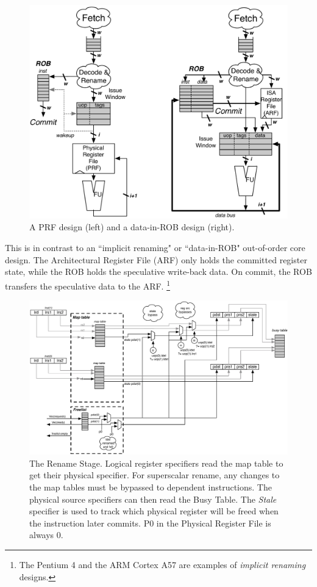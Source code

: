 \begin{figure}[htb]
	\centering
	\centerline{\includegraphics[scale =0.8] {figures/prf-and-arf}}
	\caption{ \small A PRF design (left) and a data-in-ROB design (right).}
	\label{fig:prf_design}
\end{figure}


This is in contrast to an ``implicit renaming" or ``data-in-ROB" out-of-order core design.  The Architectural Register File (ARF) only holds the committed register state, while the ROB holds the speculative write-back data.  On commit, the ROB transfers the speculative data to the ARF. \footnote{The Pentium 4 and the ARM Cortex A57 are examples of {\em implicit renaming} designs.}




\begin{figure}[htb]
	\centering
	\centerline{\includegraphics[scale =0.6] {figures/rename-pipeline}}
	\caption{ \small The Rename Stage. Logical register specifiers read the map table to get their physical specifier. For superscalar rename, any changes to the map tables must be bypassed to dependent instructions. The physical source specifiers can then read the Busy Table. The {\em Stale} specifier is used to track which physical register will be freed when the instruction later commits. P0 in the Physical Register File is always 0.}
	\label{fig:rename-pipeline}
\end{figure}


